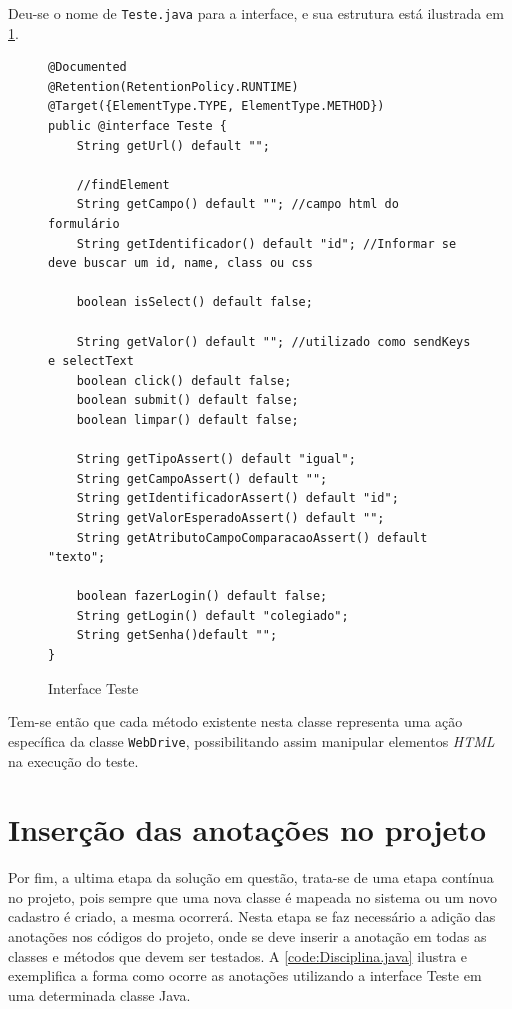 \documentclass[tg]{mdtufsm}
\begin{document}
Deu-se o nome de \texttt{Teste.java} para a interface, e sua estrutura está ilustrada em \ref{code:Teste.java}.

\begin{figure}[!htt]
\begin{lstlisting}
@Documented
@Retention(RetentionPolicy.RUNTIME)
@Target({ElementType.TYPE, ElementType.METHOD})
public @interface Teste {
    String getUrl() default "";

    //findElement
    String getCampo() default ""; //campo html do formulário
    String getIdentificador() default "id"; //Informar se deve buscar um id, name, class ou css

    boolean isSelect() default false;

    String getValor() default ""; //utilizado como sendKeys e selectText
    boolean click() default false;
    boolean submit() default false;
    boolean limpar() default false;

    String getTipoAssert() default "igual";
    String getCampoAssert() default "";
    String getIdentificadorAssert() default "id";
    String getValorEsperadoAssert() default "";
    String getAtributoCampoComparacaoAssert() default "texto";

    boolean fazerLogin() default false;
    String getLogin() default "colegiado";
    String getSenha()default "";
}
\end{lstlisting}
	\caption{Interface Teste}
	\label{code:Teste.java}
\end{figure}

Tem-se então que cada método existente nesta classe representa uma ação específica da classe \texttt{WebDrive}, possibilitando assim manipular elementos \emph{HTML} na execução do teste.

\section{Inserção das anotações no projeto}
Por fim, a ultima etapa da solução em questão, trata-se de uma etapa contínua no projeto, pois sempre que uma nova classe é mapeada no sistema ou um novo cadastro é criado, a mesma ocorrerá. Nesta etapa se faz necessário a
adição das anotações nos códigos do projeto, onde se deve inserir a anotação em todas as classes e métodos que devem ser testados.
A \ref{code:Disciplina.java} ilustra e exemplifica a forma como ocorre as anotações utilizando a interface Teste em uma determinada classe Java.
\end{document}

